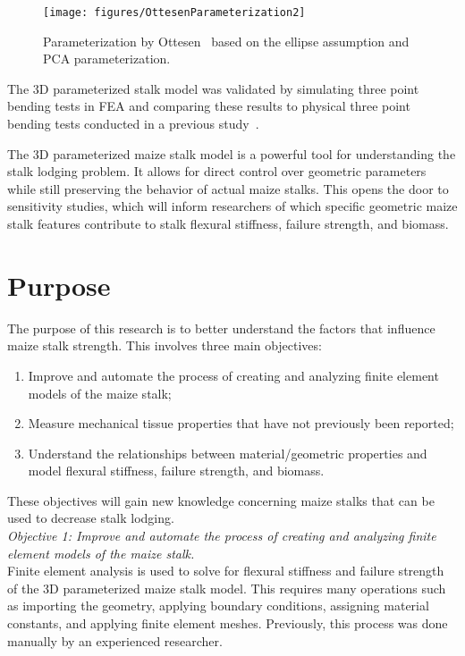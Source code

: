 \begin{figure}[htbp]
	\centering
	\texttt{[image: figures/OttesenParameterization2]}
	\caption[Parameterization by Ottesen.]{Parameterization by Ottesen~\protect\cite{ottesen_development_2023-1} based on the ellipse assumption and PCA parameterization.}
	\label{fig:OttesenParameterization}
\end{figure}

The 3D parameterized stalk model was validated by simulating three point bending tests in FEA and comparing these results to physical three point bending tests conducted in a previous study~.

The 3D parameterized maize stalk model is a powerful tool for understanding the stalk lodging problem. It allows for direct control over geometric parameters while still preserving the behavior of actual maize stalks. This opens the door to sensitivity studies, which will inform researchers of which specific geometric maize stalk features contribute to stalk flexural stiffness, failure strength, and biomass.
\newline
\newline

\section{Purpose}
\label{sec:purpose}
The purpose of this research is to better understand the factors that influence maize stalk strength. This involves three main objectives:

\begin{enumerate}
	\item Improve and automate the process of creating and analyzing finite element models of the maize stalk; 
	\item Measure mechanical tissue properties that have not previously been reported;
	\item Understand the relationships between material/geometric properties and model flexural stiffness, failure strength, and biomass.
\end{enumerate}

These objectives will gain new knowledge concerning maize stalks that can be used to decrease stalk lodging.
\\ \hfill \break
\textit{Objective 1: Improve and automate the process of creating and analyzing finite element models of the maize stalk.}
\\
Finite element analysis is used to solve for flexural stiffness and failure strength of the 3D parameterized maize stalk model. This requires many operations such as importing the geometry,  applying boundary conditions, assigning material constants, and applying finite element meshes. Previously, this process was done manually by an experienced researcher.

